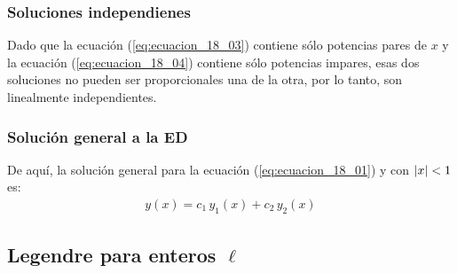 \documentclass[12pt]{beamer}
\begin{document}
\begin{frame}
\frametitle{Soluciones independienes}
Dado que la ecuación (\ref{eq:ecuacion_18_03}) contiene sólo potencias pares de $x$ y la ecuación (\ref{eq:ecuacion_18_04}) contiene sólo potencias impares, \pause esas dos soluciones no pueden ser proporcionales una de la otra, por lo tanto, son linealmente independientes.
\end{frame}
\begin{frame}
\frametitle{Solución general a la ED}
De aquí, la solución general para la ecuación (\ref{eq:ecuacion_18_01}) y con $\abs{x} < 1$ es:
\pause
\begin{align*}
y(x) = c_{1} \, y_{1} (x) + c_{2} \, y_{2} (x)
\end{align*}
\end{frame}

\subsection{Legendre para enteros \texorpdfstring{$\ell$}{l}}
\end{document}
